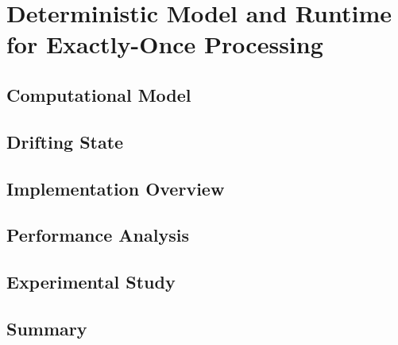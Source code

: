 \chapter{Deterministic Model and Runtime for Exactly-Once Processing}
\label{thesis-chapther-optimistic}

\section{Computational Model}

\section{Drifting State}

\section{Implementation Overview}

\section{Performance Analysis}

\section{Experimental Study}

\section{Summary}